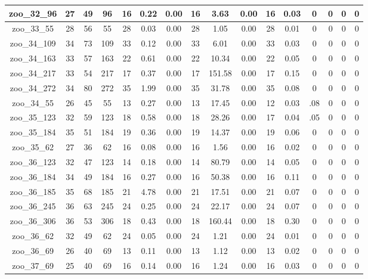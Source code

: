 \begin{landscape}
\begin{longtable}{|c|c|c|c|c|c|c|c|c|c|c|c|c|c|c|c|}
zoo\_32\_96 & 27 & 49 & 96 & 16 & 0.22 & 0.00 & 16 & 3.63 & 0.00 & 16 & 0.03 & 0 & 0 & 0 & 0 \\ \hline 
zoo\_33\_55 & 28 & 56 & 55 & 28 & 0.03 & 0.00 & 28 & 1.05 & 0.00 & 28 & 0.01 & 0 & 0 & 0 & 0 \\ \hline 
zoo\_34\_109 & 34 & 73 & 109 & 33 & 0.12 & 0.00 & 33 & 6.01 & 0.00 & 33 & 0.03 & 0 & 0 & 0 & 0 \\ \hline 
zoo\_34\_163 & 33 & 57 & 163 & 22 & 0.61 & 0.00 & 22 & 10.34 & 0.00 & 22 & 0.05 & 0 & 0 & 0 & 0 \\ \hline 
zoo\_34\_217 & 33 & 54 & 217 & 17 & 0.37 & 0.00 & 17 & 151.58 & 0.00 & 17 & 0.15 & 0 & 0 & 0 & 0 \\ \hline 
zoo\_34\_272 & 34 & 80 & 272 & 35 & 1.99 & 0.00 & 35 & 31.78 & 0.00 & 35 & 0.08 & 0 & 0 & 0 & 0 \\ \hline 
zoo\_34\_55 & 26 & 45 & 55 & 13 & 0.27 & 0.00 & 13 & 17.45 & 0.00 & 12 & 0.03 & .08 & 0 & 0 & 0 \\ \hline 
zoo\_35\_123 & 32 & 59 & 123 & 18 & 0.58 & 0.00 & 18 & 28.26 & 0.00 & 17 & 0.04 & .05 & 0 & 0 & 0 \\ \hline 
zoo\_35\_184 & 35 & 51 & 184 & 19 & 0.36 & 0.00 & 19 & 14.37 & 0.00 & 19 & 0.06 & 0 & 0 & 0 & 0 \\ \hline 
zoo\_35\_62 & 27 & 36 & 62 & 16 & 0.08 & 0.00 & 16 & 1.56 & 0.00 & 16 & 0.02 & 0 & 0 & 0 & 0 \\ \hline 
zoo\_36\_123 & 32 & 47 & 123 & 14 & 0.18 & 0.00 & 14 & 80.79 & 0.00 & 14 & 0.05 & 0 & 0 & 0 & 0 \\ \hline 
zoo\_36\_184 & 34 & 49 & 184 & 16 & 0.27 & 0.00 & 16 & 50.38 & 0.00 & 16 & 0.11 & 0 & 0 & 0 & 0 \\ \hline 
zoo\_36\_185 & 35 & 68 & 185 & 21 & 4.78 & 0.00 & 21 & 17.51 & 0.00 & 21 & 0.07 & 0 & 0 & 0 & 0 \\ \hline 
zoo\_36\_245 & 36 & 63 & 245 & 24 & 0.25 & 0.00 & 24 & 22.17 & 0.00 & 24 & 0.07 & 0 & 0 & 0 & 0 \\ \hline 
zoo\_36\_306 & 36 & 53 & 306 & 18 & 0.43 & 0.00 & 18 & 160.44 & 0.00 & 18 & 0.30 & 0 & 0 & 0 & 0 \\ \hline 
zoo\_36\_62 & 32 & 49 & 62 & 24 & 0.05 & 0.00 & 24 & 1.21 & 0.00 & 24 & 0.01 & 0 & 0 & 0 & 0 \\ \hline 
zoo\_36\_69 & 26 & 40 & 69 & 13 & 0.11 & 0.00 & 13 & 1.12 & 0.00 & 13 & 0.02 & 0 & 0 & 0 & 0 \\ \hline 
zoo\_37\_69 & 25 & 40 & 69 & 16 & 0.14 & 0.00 & 16 & 1.24 & 0.00 & 16 & 0.03 & 0 & 0 & 0 & 0 \\ \hline 

\end{longtable}
\end{landscape}
